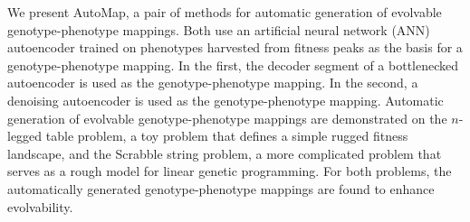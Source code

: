 We present AutoMap, a pair of methods for automatic generation of evolvable genotype-phenotype mappings.
Both use an artificial neural network (ANN) autoencoder trained on phenotypes harvested from fitness peaks as the basis for a genotype-phenotype mapping.
In the first, the decoder segment of a bottlenecked autoencoder is used as the genotype-phenotype mapping.
In the second, a denoising autoencoder is used as the genotype-phenotype mapping.
Automatic generation of evolvable genotype-phenotype mappings are demonstrated on the $n$-legged table problem, a toy problem that defines a simple rugged fitness landscape, and the Scrabble string problem, a more complicated problem that serves as a rough model for linear genetic programming.
For both problems, the automatically generated genotype-phenotype mappings are found to enhance evolvability.
